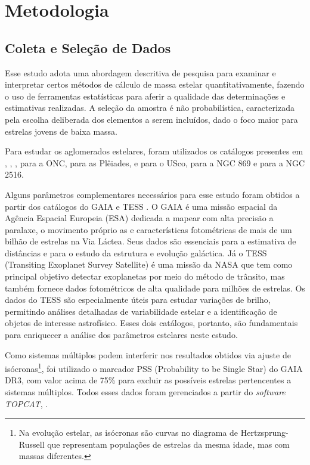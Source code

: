 
\chapter{\textbf{Metodologia}}\label{cap:metodologia}
    \section{Coleta e Seleção de Dados}\label{sec:coleta}
        Esse estudo adota uma abordagem descritiva de pesquisa para examinar e interpretar certos métodos de cálculo de massa estelar quantitativamente, fazendo o uso de ferramentas estatísticas para aferir a qualidade das determinações e estimativas realizadas. A seleção da amostra é não probabilística, caracterizada pela escolha deliberada dos elementos a serem incluídos, dado o foco maior para estrelas jovens de baixa massa. 
            
        Para estudar os aglomerados estelares, foram utilizados os catálogos presentes em , , ,  para a ONC,  para as Plêiades,  e  para o USco,  para a NGC 869 e  para a NGC 2516.
        
		Alguns parâmetros complementares necessários para esse estudo foram obtidos a partir dos catálogos do GAIA \cite{gaia2022, gaia2022b} e TESS \cite{paegert2021tessinputcatalogversions}. O GAIA é uma missão espacial da Agência Espacial Europeia (ESA) dedicada a mapear com alta precisão a paralaxe, o movimento próprio as e características fotométricas de mais de um bilhão de estrelas na Via Láctea. Seus dados são essenciais para a estimativa de distâncias e para o estudo da estrutura e evolução galáctica. Já o TESS (Transiting Exoplanet Survey Satellite) é uma missão da NASA que tem como principal objetivo detectar exoplanetas por meio do método de trânsito, mas também fornece dados fotométricos de alta qualidade para milhões de estrelas. Os dados do TESS são especialmente úteis para estudar variações de brilho, permitindo análises detalhadas de variabilidade estelar e a identificação de objetos de interesse astrofísico. Esses dois catálogos, portanto, são fundamentais para enriquecer a análise dos parâmetros estelares neste estudo.
		
        Como sistemas múltiplos podem interferir nos resultados obtidos via ajuste de isócronas\footnote{ Na evolução estelar, as isócronas são curvas no diagrama de Hertzsprung-Russell que representam populações de estrelas da mesma idade, mas com massas diferentes.}, foi utilizado o marcador PSS (Probability to be Single Star) do GAIA DR3, com valor acima de 75\% para excluir as possíveis estrelas pertencentes a sistemas múltiplos. Todos esses dados foram gerenciados a partir do \textit{software} \textit{TOPCAT}, \cite{Taylor2005}.
        

